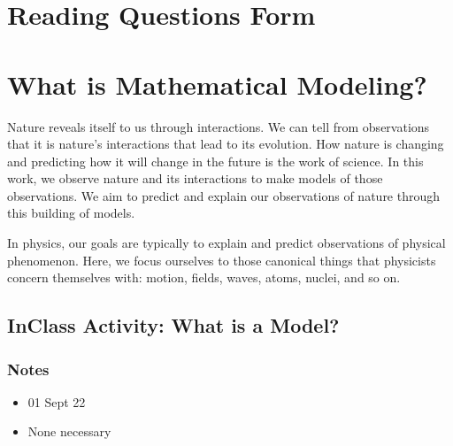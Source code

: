 \documentclass[letterpaper,10pt,english]{jupyterBook}
\begin{document}
\sphinxstepscope


\chapter{Reading Questions Form}
\label{\detokenize{content/0_course/reading_questions:reading-questions-form}}\label{\detokenize{content/0_course/reading_questions::doc}}


\sphinxstepscope


\chapter{What is Mathematical Modeling?}
\label{\detokenize{content/1_modeling/what_is_modeling:what-is-mathematical-modeling}}\label{\detokenize{content/1_modeling/what_is_modeling::doc}}
\sphinxAtStartPar
Nature reveals itself to us through interactions. We can tell from observations that it is nature’s interactions that lead to its evolution. How nature is changing and predicting how it will change in the future is the work of science. In this work, we observe nature and its interactions to make models of those observations. We aim to predict and explain our observations of nature through this building of models.

\sphinxAtStartPar
In physics, our goals are typically to explain and predict observations of physical phenomenon. Here, we focus ourselves to those canonical things that physicists concern themselves with: motion, fields, waves, atoms, nuclei, and so on.

\sphinxstepscope


\section{In\sphinxhyphen{}Class Activity: What is a Model?}
\label{\detokenize{content/1_modeling/activity-what_is_a_model:in-class-activity-what-is-a-model}}\label{\detokenize{content/1_modeling/activity-what_is_a_model::doc}}

\subsection{Notes}
\label{\detokenize{content/1_modeling/activity-what_is_a_model:notes}}\begin{itemize}
\item {} 
\sphinxAtStartPar
{} 01 Sept 22

\item {} 
\sphinxAtStartPar
{} None necessary

\end{itemize}
\end{document}
